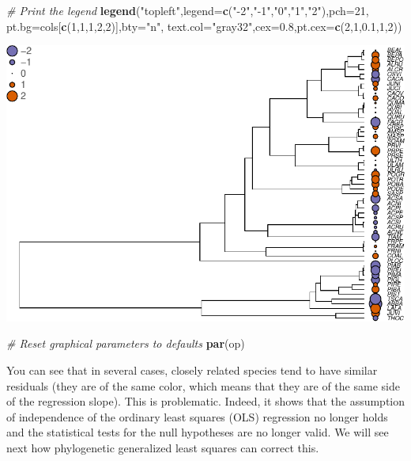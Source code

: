\documentclass[
]{book}
\newenvironment{Shaded}{\begin{snugshade}}{\end{snugshade}}
\newcommand{\AttributeTok}[1]{\textcolor[rgb]{0.13,0.29,0.53}{#1}}
\newcommand{\CommentTok}[1]{\textcolor[rgb]{0.56,0.35,0.01}{\textit{#1}}}
\newcommand{\DecValTok}[1]{\textcolor[rgb]{0.00,0.00,0.81}{#1}}
\newcommand{\FloatTok}[1]{\textcolor[rgb]{0.00,0.00,0.81}{#1}}
\newcommand{\FunctionTok}[1]{\textcolor[rgb]{0.13,0.29,0.53}{\textbf{#1}}}
\newcommand{\NormalTok}[1]{#1}
\newcommand{\StringTok}[1]{\textcolor[rgb]{0.31,0.60,0.02}{#1}}
\begin{document}
\begin{Shaded}
\begin{Highlighting}[]
\CommentTok{\# Print the legend}
\FunctionTok{legend}\NormalTok{(}\StringTok{"topleft"}\NormalTok{,}\AttributeTok{legend=}\FunctionTok{c}\NormalTok{(}\StringTok{"{-}2"}\NormalTok{,}\StringTok{"{-}1"}\NormalTok{,}\StringTok{"0"}\NormalTok{,}\StringTok{"1"}\NormalTok{,}\StringTok{"2"}\NormalTok{),}\AttributeTok{pch=}\DecValTok{21}\NormalTok{,}
       \AttributeTok{pt.bg=}\NormalTok{cols[}\FunctionTok{c}\NormalTok{(}\DecValTok{1}\NormalTok{,}\DecValTok{1}\NormalTok{,}\DecValTok{1}\NormalTok{,}\DecValTok{2}\NormalTok{,}\DecValTok{2}\NormalTok{)],}\AttributeTok{bty=}\StringTok{"n"}\NormalTok{,}
       \AttributeTok{text.col=}\StringTok{"gray32"}\NormalTok{,}\AttributeTok{cex=}\FloatTok{0.8}\NormalTok{,}\AttributeTok{pt.cex=}\FunctionTok{c}\NormalTok{(}\DecValTok{2}\NormalTok{,}\DecValTok{1}\NormalTok{,}\FloatTok{0.1}\NormalTok{,}\DecValTok{1}\NormalTok{,}\DecValTok{2}\NormalTok{))}
\end{Highlighting}
\end{Shaded}

\begin{center}\includegraphics{pcm-workshop_files/figure-latex/Residuals of lm on phylogeny-1} \end{center}

\begin{Shaded}
\begin{Highlighting}[]
\CommentTok{\# Reset graphical parameters to defaults}
\FunctionTok{par}\NormalTok{(op) }
\end{Highlighting}
\end{Shaded}

You can see that in several cases, closely related species tend to have similar residuals (they are of the same color, which means that they are of the same side of the regression slope). This is problematic. Indeed, it shows that the assumption of independence of the ordinary least squares (OLS) regression no longer holds and the statistical tests for the null hypotheses are no longer valid. We will see next how phylogenetic generalized least squares can correct this.
\end{document}
